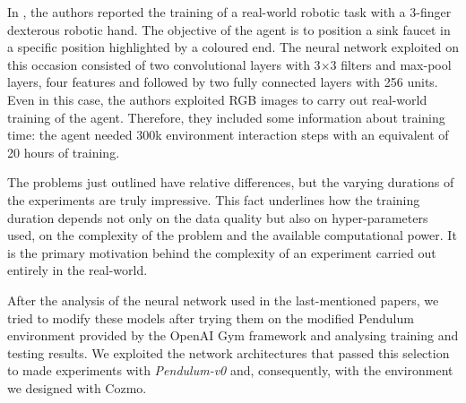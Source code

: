 In \cite{haarnoja2018alg}, the authors reported the training of a real-world robotic task with a 3-finger dexterous robotic hand.
The objective of the agent is to position a sink faucet in a specific position highlighted by a coloured end.
The neural network exploited on this occasion consisted of two convolutional layers with 3$\times$3 filters and max-pool layers, four features and followed by two fully connected layers with 256 units.
Even in this case, the authors exploited RGB images to carry out real-world training of the agent.
Therefore, they included some information about training time: the agent needed 300k environment interaction steps with an equivalent of 20 hours of training.

The problems just outlined have relative differences, but the varying durations of the experiments are truly impressive.
This fact underlines how the training duration depends not only on the data quality but also on hyper-parameters used, on the complexity of the problem and the available computational power.
It is the primary motivation behind the complexity of an experiment carried out entirely in the real-world.

After the analysis of the neural network used in the last-mentioned papers, we tried to modify these models after trying them on the modified Pendulum environment provided by the OpenAI Gym framework and analysing training and testing results.
We exploited the network architectures that passed this selection to made experiments with \textit{Pendulum-v0} and, consequently, with the environment we designed with Cozmo.

